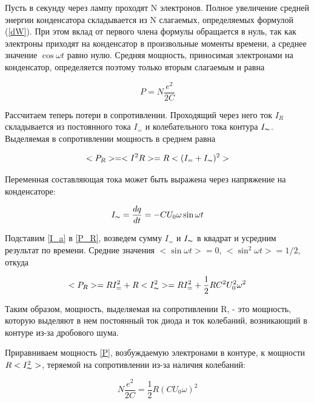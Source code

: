 \documentclass[12pt,a4paper]{article}
\begin{document}
\par Пусть в секунду через лампу проходят N электронов. Полное увеличение средней энергии конденсатора складывается из N слагаемых, определяемых формулой (\ref{dW}). При этом вклад от первого члена формулы обращается в нуль, так как электроны приходят на конденсатор в произвольные моменты времени, а среднее значение $\cos\omega{t}$ равно нулю. Средняя мощность, приносимая электронами на конденсатор, определяется поэтому только вторым слагаемым и равна

\begin{equation}\label{P}
P = N\frac{e^2}{2C}
\end{equation}

\par Рассчитаем теперь потери в сопротивлении. Проходящий через него ток $I_R$ складывается из постоянного тока $I_=$ и колебательного тока контура $I_\thicksim$. Выделяемая в сопротивлении мощность в среднем равна 

\begin{equation}\label{P_R}
<P_R> = <I^2R> = R<(I_= + I_\thicksim)^2>
\end{equation}

\par Переменная составляющая тока может быть выражена через напряжение на конденсаторе:

\begin{equation}\label{I_a}
I_\thicksim = \frac{dq}{dt} = -CU_0\omega\sin\omega{t}
\end{equation}

\par Подставим \ref{I_a} в \ref{P_R}, возведем сумму $I_=$ и $I_\thicksim$ в квадрат и усредним результат по времени. Средние значения $<\sin\omega{t}> = 0$, $<\sin^2\omega{t}> = 1/2$, откуда 

\begin{equation}\label{P_R}
<P_R> = RI_=^2 + R<I_\thicksim^2> = RI_=^2 + \frac{1}{2}RC^2U_0^2\omega^2
\end{equation} 

\par Таким образом, мощность, выделяемая на сопротивлении R, - это мощность, которую выделяют в нем постоянный ток диода и ток колебаний, возникающий в контуре из-за дробового шума.
\par Приравниваем мощность \ref{P}, возбуждаемую электронами в контуре, к мощности $R<I_\thicksim^2>$, теряемой на сопротивлении из-за наличия колебаний: 

\begin{equation}\label{9}
N\frac{e^2}{2C} = \frac{1}{2}R(CU_0\omega)^2
\end{equation}
\end{document}
